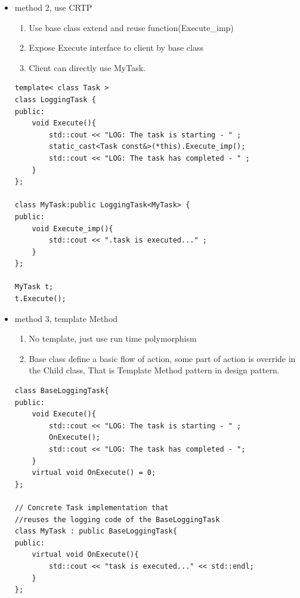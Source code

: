 \documentclass[a4paper,11pt,twoside]{book}
\begin{document}
\begin{itemize}
	\item method 2, use CRTP
	\begin{enumerate}
		\item Use base class extend and reuse function(Execute\_imp)
		\item Expose Execute interface to client by base class 
		\item Client can directly use MyTask.
	\end{enumerate}
\begin{lstlisting}[numbers=none]
template< class Task >
class LoggingTask {
public:
	void Execute(){
		std::cout << "LOG: The task is starting - " ;
		static_cast<Task const&>(*this).Execute_imp();
		std::cout << "LOG: The task has completed - " ;
	}
};
	
class MyTask:public LoggingTask<MyTask> {
public:
	void Execute_imp(){
		std::cout << ".task is executed..." ;
	}
};
	
MyTask t;
t.Execute();
\end{lstlisting}
	
	\item method 3, template Method
	\begin{enumerate}
		\item No template, just use run time polymorphism
		\item Base class define a basic flow of action, some part of action is override in the Child class, That is Template Method pattern in design pattern.
	\end{enumerate}
\begin{lstlisting}[numbers=none]
class BaseLoggingTask{
public:
	void Execute(){
		std::cout << "LOG: The task is starting - " ;
		OnExecute();
		std::cout << "LOG: The task has completed - ";
	}
	virtual void OnExecute() = 0;
};
	
// Concrete Task implementation that 
//reuses the logging code of the BaseLoggingTask
class MyTask : public BaseLoggingTask{
public:
	virtual void OnExecute(){
		std::cout << "task is executed..." << std::endl;
	}
};
	\end{lstlisting}
	

\end{itemize}
\end{document}
